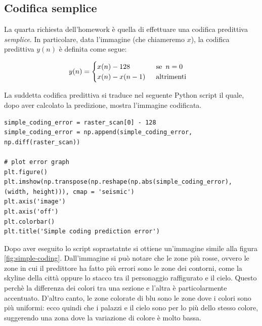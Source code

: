 \vspace{15px}\subsection{Codifica semplice}\label{simple-coding}
La quarta richiesta dell'homework è quella di effettuare una codifica predittiva \textsl{semplice}. In particolare, data l'immagine (che chiameremo $x$), la codifica predittiva $y(n)$ è definita come segue:

\begin{gather*}
    y(n) = 
    \begin{cases}
        x(n) - 128 \hspace{37px} \text{se } \, n = 0 \\
        x(n) - x(n - 1) \hspace{15px} \text{altrimenti}\\
    \end{cases}
\end{gather*}

\noindent La suddetta codifica predittiva si traduce nel seguente Python script il quale, dopo aver calcolato la predizione, mostra l'immagine codificata.

\begin{lstlisting}
simple_coding_error = raster_scan[0] - 128
simple_coding_error = np.append(simple_coding_error, np.diff(raster_scan))

# plot error graph
plt.figure()
plt.imshow(np.transpose(np.reshape(np.abs(simple_coding_error), (width, height))), cmap = 'seismic')
plt.axis('image')
plt.axis('off')
plt.colorbar()
plt.title('Simple coding prediction error')
\end{lstlisting}

\noindent Dopo aver eseguito lo script soprastatnte si ottiene un'immagine simile alla figura \ref{fig:simple-coding}. Dall'immagine si può notare che le zone più rosse, ovvero le zone in cui il predittore ha fatto più errori sono le zone dei contorni, come la skyline della città oppure lo stacco tra il personaggio raffigurato e il cielo. Questo perchè la differenza dei colori tra una sezione e l'altra è particolarmente accentuato. D'altro canto, le zone colorate di blu sono le zone dove i colori sono più uniformi: ecco quindi che i palazzi e il cielo sono per lo più dello stesso colore, suggerendo una zona dove la variazione di colore è molto bassa.

